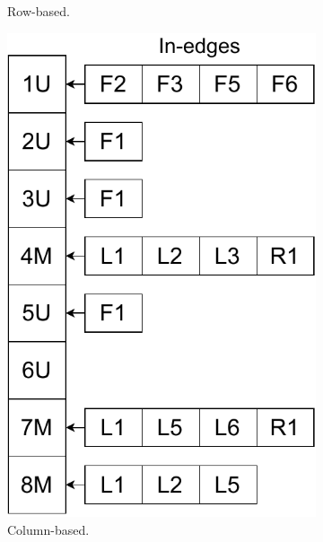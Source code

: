 \begin{figure}
\begin{minipage}[b]{0.68\textwidth}
\begin{subfigure}[b]{0.35\textwidth}
      \caption{Row-based.}\label{fig:data_row}
    \end{subfigure}
    \quad
    \begin{subfigure}[b]{0.2\textwidth}
      \centering
      \includegraphics[scale=0.3]{img/data_column}
      \caption{Column-based.}\label{fig:data_column}
    \end{subfigure}
    \quad
    \begin{subfigure}[b]{0.3\textwidth}
      \centering

\end{subfigure}
\end{minipage}
\end{figure}
